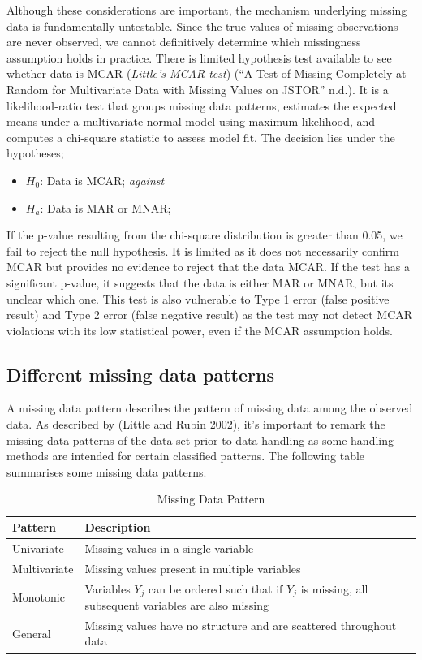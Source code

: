 \documentclass{article}
\providecommand{\tightlist}{%
  \setlength{\itemsep}{0pt}\setlength{\parskip}{0pt}}
\begin{document}
Although these considerations are important, the mechanism underlying
missing data is fundamentally untestable. Since the true values of
missing observations are never observed, we cannot definitively
determine which missingness assumption holds in practice. There is
limited hypothesis test available to see whether data is MCAR
(\emph{Little's MCAR test}) ({``A {Test} of {Missing} {Completely} at
{Random} for {Multivariate} {Data} with {Missing} {Values} on {JSTOR}''}
n.d.). It is a likelihood-ratio test that groups missing data patterns,
estimates the expected means under a multivariate normal model using
maximum likelihood, and computes a chi-square statistic to assess model
fit. The decision lies under the hypotheses;

\begin{itemize}
\tightlist
\item
  \(H_0\): Data is MCAR; \emph{against}
\item
  \(H_a\): Data is MAR or MNAR;
\end{itemize}

If the p-value resulting from the chi-square distribution is greater
than 0.05, we fail to reject the null hypothesis. It is limited as it
does not necessarily confirm MCAR but provides no evidence to reject
that the data MCAR. If the test has a significant p-value, it suggests
that the data is either MAR or MNAR, but its unclear which one. This
test is also vulnerable to Type 1 error (false positive result) and Type
2 error (false negative result) as the test may not detect MCAR
violations with its low statistical power, even if the MCAR assumption
holds.

\newpage

\subsection{Different missing data
patterns}\label{different-missing-data-patterns}

A missing data pattern describes the pattern of missing data among the
observed data. As described by (Little and Rubin 2002), it's important
to remark the missing data patterns of the data set prior to data
handling as some handling methods are intended for certain classified
patterns. The following table summarises some missing data patterns.

\begin{table}[H]
\centering
\caption{Missing Data Pattern}
\label{}

\begin{tabular}{ll}
\toprule
Pattern & Description\\
\midrule
Univariate & Missing values in a single variable\\
Multivariate & Missing values present in multiple variables\\
Monotonic & Variables $Y_j$ can be ordered such that if $Y_j$ is missing, all subsequent variables are also missing\\
General & Missing values have no structure and are scattered throughout data\\
\bottomrule
\end{tabular}
\end{table}
\end{document}
